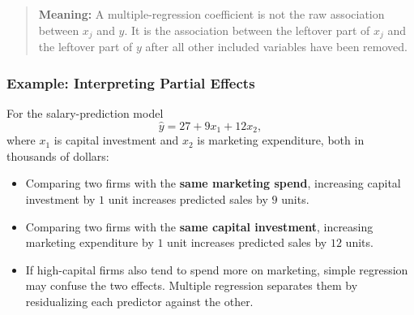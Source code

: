 \documentclass[12pt,openany]{book}
\begin{document}
\begin{quote}
\textbf{Meaning:} A multiple-regression coefficient is not the raw association between \(x_j\) and \(y\). It is the association between the leftover part of \(x_j\) and the leftover part of \(y\) after all other included variables have been removed.
\end{quote}


\begin{center}
\end{center}


\subsubsection{Example: Interpreting Partial Effects}

For the salary-prediction model
\[
\hat{y}=27+9x_1+12x_2,
\]
where \(x_1\) is capital investment and \(x_2\) is marketing expenditure, both in thousands of dollars:
\begin{itemize}[leftmargin=*]
    \item Comparing two firms with the \textbf{same marketing spend}, increasing capital investment by \(1\) unit increases predicted sales by \(9\) units.
    \item Comparing two firms with the \textbf{same capital investment}, increasing marketing expenditure by \(1\) unit increases predicted sales by \(12\) units.
    \item If high-capital firms also tend to spend more on marketing, simple regression may confuse the two effects. Multiple regression separates them by residualizing each predictor against the other.
\end{itemize}
\end{document}
